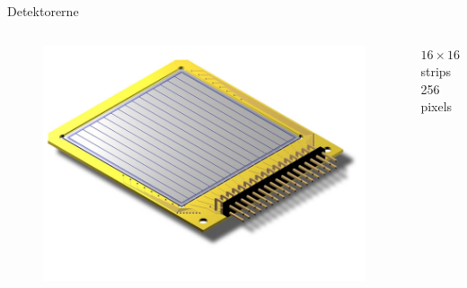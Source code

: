 \begin{frame}{Detektorerne}
	\begin{columns}
		\begin{figure}
			\centering
			\includegraphics[width=.5\columnwidth]{../figures/W1.jpg}
		\end{figure}
		$16\times16$ strips\\
		256 pixels 
	\end{columns}
\end{frame}

